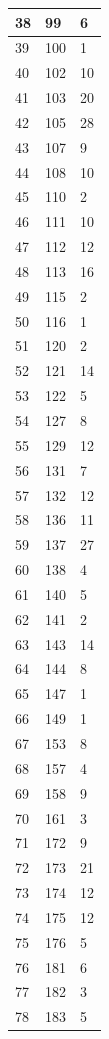 \begin{tabular}{p{}p{}p{}}
\hline
38 & 99 & 6 \\
\hline
39 & 100 & 1 \\
\hline
40 & 102 & 10 \\
\hline
41 & 103 & 20 \\
\hline
42 & 105 & 28 \\
\hline
43 & 107 & 9 \\
\hline
44 & 108 & 10 \\
\hline
45 & 110 & 2 \\
\hline
46 & 111 & 10 \\
\hline
47 & 112 & 12 \\
\hline
48 & 113 & 16 \\
\hline
49 & 115 & 2 \\
\hline
50 & 116 & 1 \\
\hline
51 & 120 & 2 \\
\hline
52 & 121 & 14 \\
\hline
53 & 122 & 5 \\
\hline
54 & 127 & 8 \\
\hline
55 & 129 & 12 \\
\hline
56 & 131 & 7 \\
\hline
57 & 132 & 12 \\
\hline
58 & 136 & 11 \\
\hline
59 & 137 & 27 \\
\hline
60 & 138 & 4 \\
\hline
61 & 140 & 5 \\
\hline
62 & 141 & 2 \\
\hline
63 & 143 & 14 \\
\hline
64 & 144 & 8 \\
\hline
65 & 147 & 1 \\
\hline
66 & 149 & 1 \\
\hline
67 & 153 & 8 \\
\hline
68 & 157 & 4 \\
\hline
69 & 158 & 9 \\
\hline
70 & 161 & 3 \\
\hline
71 & 172 & 9 \\
\hline
72 & 173 & 21 \\
\hline
73 & 174 & 12 \\
\hline
74 & 175 & 12 \\
\hline
75 & 176 & 5 \\
\hline
76 & 181 & 6 \\
\hline
77 & 182 & 3 \\
\hline
78 & 183 & 5 \\
\hline

\end{tabular}
